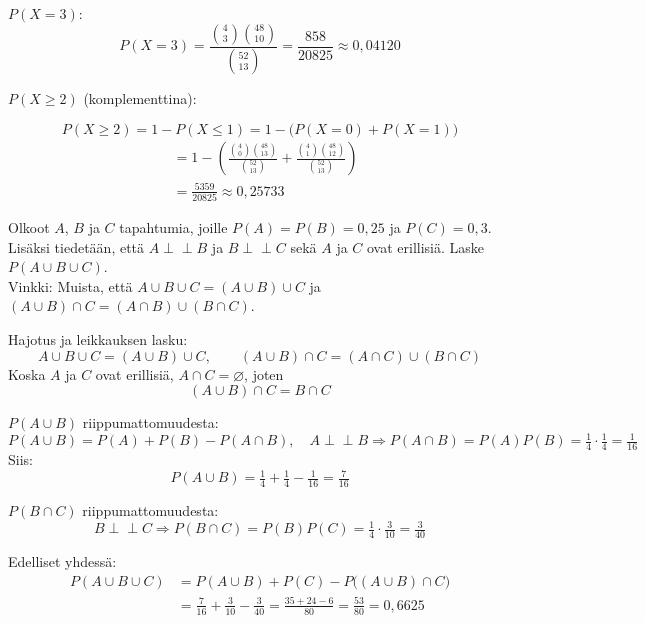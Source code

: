 \documentclass[12pt,a4paper]{article}
\newcommand{\riip}{\perp \!\!\! \perp}
\begin{document}
\begin{kohta}
\item $P(X=3)$:
\[
P(X=3)=\frac{\binom{4}{3}\binom{48}{10}}{\binom{52}{13}}
=\frac{858}{20825}\approx 0{,}04120
\]

\item $P(X\ge 2)$ (komplementtina):

\[ P(X \ge 2) = 1 - P(X \le 1) = 1 - \big( P(X=0) + P(X=1) \big) \]
\[ 
\begin{aligned}
&= 1 - \left( \frac{\binom{4}{0}\binom{48}{13}}{\binom{52}{13}} + \frac{\binom{4}{1}\binom{48}{12}}{\binom{52}{13}} \right)\\
&=\frac{5359}{20825}\approx 0{,}25733
\end{aligned}
\]
\end{kohta}





\pagebreak
{}
Olkoot $A$, $B$ ja $C$ tapahtumia, joille $P(A)=P(B)=0{,}25$ ja $P(C)=0{,}3$. Lisäksi tiedetään, että $A\riip B$ ja $B\riip C$ sekä $A$ ja $C$ ovat erillisiä. Laske $P(A\cup B\cup C)$.\\

\noindent Vinkki: Muista, että $A\cup B\cup C=(A\cup B)\cup C$ ja $(A\cup B)\cap C=(A\cap B)\cup(B\cap C)$.


\begin{alakohta}
\item Hajotus ja leikkauksen lasku:
\[
A\cup B\cup C=(A\cup B)\cup C,\qquad
(A\cup B)\cap C=(A\cap C)\cup(B\cap C)
\]
Koska $A$ ja $C$ ovat erillisiä, $A\cap C=\varnothing$, joten
\[
(A\cup B)\cap C = B\cap C
\]

\item $P(A\cup B)$ riippumattomuudesta:
\[
P(A\cup B)=P(A)+P(B)-P(A\cap B),
\quad A\riip B\Rightarrow P(A\cap B)=P(A)P(B)=\tfrac14\cdot\tfrac14=\tfrac{1}{16}
\]
Siis:
\[
P(A\cup B)=\tfrac14+\tfrac14-\tfrac{1}{16}=\tfrac{7}{16}
\]

\item $P(B\cap C)$ riippumattomuudesta:
\[
B\riip C\Rightarrow P(B\cap C)=P(B)P(C)=\tfrac14\cdot\tfrac{3}{10}=\tfrac{3}{40}
\]

\item Edelliset yhdessä:
\[
\begin{aligned}
P(A\cup B\cup C)
&=P(A\cup B)+P(C)-P\big((A\cup B)\cap C\big)\\
&=\tfrac{7}{16}+\tfrac{3}{10}-\tfrac{3}{40}
= \frac{35+24-6}{80}
= \frac{53}{80}
=0{,}6625
\end{aligned}
\]
\end{alakohta}
\end{document}
